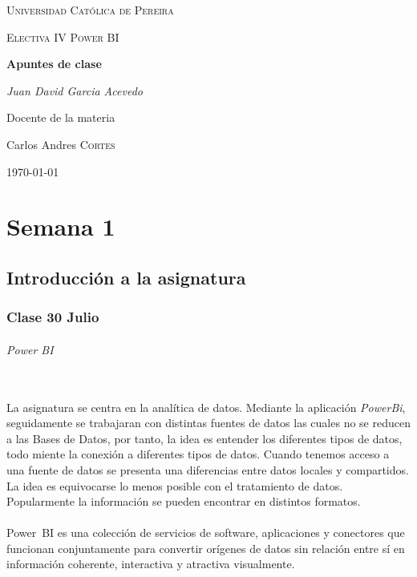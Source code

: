 \documentclass[a4paper]{report} %
\begin{document}
  \begin{titlepage}
    \centering
    {\scshape\LARGE Universidad Católica de Pereira\par}
    \vfill
    {\scshape\LARGE Electiva IV Power BI\par}
    \vfill
    {\huge\bfseries Apuntes de clase\par}
    \vfill
    {\Large\itshape Juan David Garcia Acevedo\par}
    \vfill
    Docente de la materia\par
	   Carlos Andres \textsc{Cortes}
    \vfill
    {\Large\today\par}
  \end{titlepage}
  \tableofcontents %
    \part{Semana 1}
      \chapter{Introducción a la asignatura}
        \section{Clase 30 Julio} 
            \paragraph{Power BI}\mbox{} \\
              La asignatura se centra en la analítica de datos. Mediante la aplicación \textit{PowerBi}, seguidamente se trabajaran con distintas fuentes de datos las cuales no se reducen a las Bases de Datos, por tanto, la idea es entender los diferentes tipos de datos, todo miente la conexión a diferentes tipos de datos. Cuando tenemos acceso a una fuente de datos se presenta una diferencias entre datos locales y compartidos. La idea es equivocarse lo menos posible con el tratamiento de datos.
              \\Popularmente la información se pueden encontrar en distintos formatos.
              \\\\Power BI es una colección de servicios de software, aplicaciones y conectores que funcionan conjuntamente para convertir orígenes de datos sin relación entre sí en información coherente, interactiva y atractiva visualmente.
\end{document}
